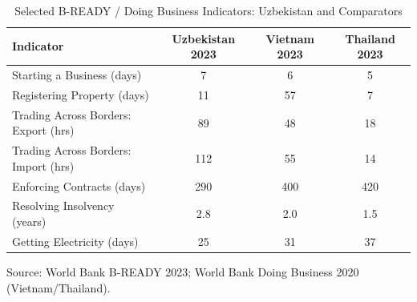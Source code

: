 \begin{table}[!h]
\centering
\caption{\label{tab:bready}Selected B-READY / Doing Business Indicators: Uzbekistan and Comparators}
\centering
\begin{threeparttable}
\begin{tabular}[t]{lccc}
\toprule
Indicator & Uzbekistan 2023 & Vietnam 2023 & Thailand 2023\\
\midrule
Starting a Business (days) & 7 & 6 & 5\\
Registering Property (days) & 11 & 57 & 7\\
Trading Across Borders: Export (hrs) & 89 & 48 & 18\\
Trading Across Borders: Import (hrs) & 112 & 55 & 14\\
Enforcing Contracts (days) & 290 & 400 & 420\\
\addlinespace
Resolving Insolvency (years) & 2.8 & 2.0 & 1.5\\
Getting Electricity (days) & 25 & 31 & 37\\
\bottomrule
\end{tabular}
\begin{tablenotes}
\item Source: World Bank B-READY 2023; World Bank Doing Business 2020 (Vietnam/Thailand).
\end{tablenotes}
\end{threeparttable}
\end{table}
